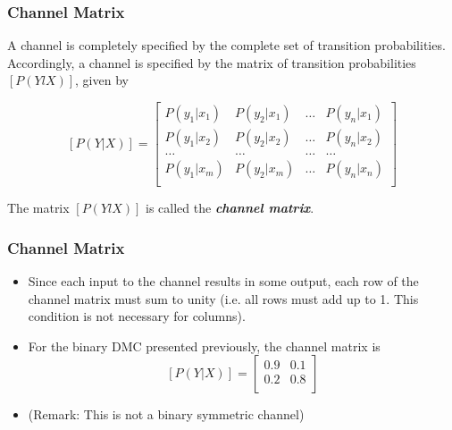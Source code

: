\documentclass[a4]{beamer}
\begin{document}
%

\begin{frame}
\frametitle{Channel Matrix}

A channel is completely specified by the complete set of transition probabilities. Accordingly, a
channel is specified by the matrix of transition probabilities $[P(YlX)]$, given by

\[  [P(Y|X)]  = \left[ \begin{array}{cccc}
P(y_1|x_1) & P(y_2|x_1) & \ldots & P(y_n|x_1) \\
P(y_1|x_2) & P(y_2|x_2) & \ldots & P(y_n|x_2) \\
\ldots & \ldots & \ldots & \ldots \\
P(y_1|x_m) & P(y_2|x_m) & \ldots & P(y_n|x_n) \\
\end{array} \right] \]


The matrix $[P(YlX)]$ is called the \textbf{\emph{channel matrix}}.
\end{frame}

\begin{frame}
\frametitle{Channel Matrix}
\begin{itemize}
\item Since each input to the channel results in some
output, each row of the channel matrix must sum to unity (i.e. all rows must add up to 1. This condition is not necessary for columns).
\item For the binary DMC presented previously, the channel matrix is
\[  [P(Y|X)]  = \left[ \begin{array}{cc}
0.9 & 0.1  \\
0.2 & 0.8 \\
\end{array} \right] \]
\item (Remark: This is not a binary symmetric channel)
\end{itemize}
\end{frame}
\end{document}
